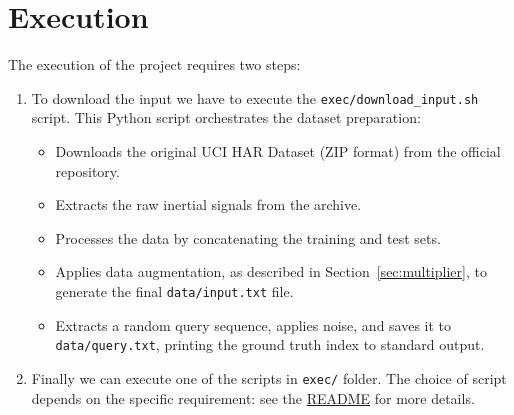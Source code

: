 \section{Execution}
The execution of the project requires two steps:
\begin{enumerate}
    \item To download the input we have to execute the \texttt{exec/download\_input.sh} script. This Python script orchestrates the dataset preparation:
    \begin{itemize}
        \item Downloads the original UCI HAR Dataset (ZIP format) from the official repository.
        \item Extracts the raw inertial signals from the archive.
        \item Processes the data by concatenating the training and test sets.
        \item Applies data augmentation, as described in Section~\ref{sec:multiplier}, to generate the final \texttt{data/input.txt} file.
        \item Extracts a random query sequence, applies noise, and saves it to \texttt{data/query.txt}, printing the ground truth index to standard output.
    \end{itemize}
    \item Finally we can execute one of the scripts in \texttt{exec/} folder. The choice of script depends on the specific requirement: see the \href{https://github.com/edoardosarri24/time-series-pattern-recognition/blob/master/README.md}{README} for more details.
\end{enumerate}